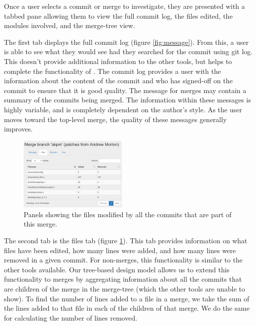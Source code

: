 \documentclass[conference, draftclsnofoot, draft]{IEEEtran}
\begin{document}
Once a user selects a commit or merge to investigate, they are presented with a
tabbed pane allowing them to view the full commit log, the files edited, the modules
involved, and the merge-tree view.

The first tab displays the full commit log (figure \ref{fig:message}). From this, a
user is able to see what they would see had they searched for the commit using git
log. This doesn't provide additional information to the other tools, but helps to
complete the functionality of \tool. The commit log provides a user with the
information about the content of the commit and who has signed-off on the commit to
ensure that it is good quality. The message for merges may contain a summary of the
commits being merged.  The information within these messages is highly variable, and
is completely dependent on the author's style. As the user moves toward the
top-level merge, the quality of these messages generally improves.

\begin{figure}
        \centering
        \includegraphics[width=0.47\textwidth]{figures/files_view_2.png}
        \caption{Panels showing the files modified by all the commits that are part of this merge.}
        \label{fig:files}
\end{figure}

The second tab is the files tab (figure \ref{fig:files}). This tab provides information on what files have been edited, how many lines were added, and how many
lines were removed in a given commit. For non-merges, this functionality is similar to the other tools available. Our tree-based design model allows us to
extend this functionality to merges by aggregating information about all the commits that are children of the merge in the merge-tree (which the other tools are
unable to show). To find the number of lines added to a file in a merge, we take the sum of the lines added to that file in each of the children of that
merge. We do the same for calculating the number of lines removed. 
\end{document}
